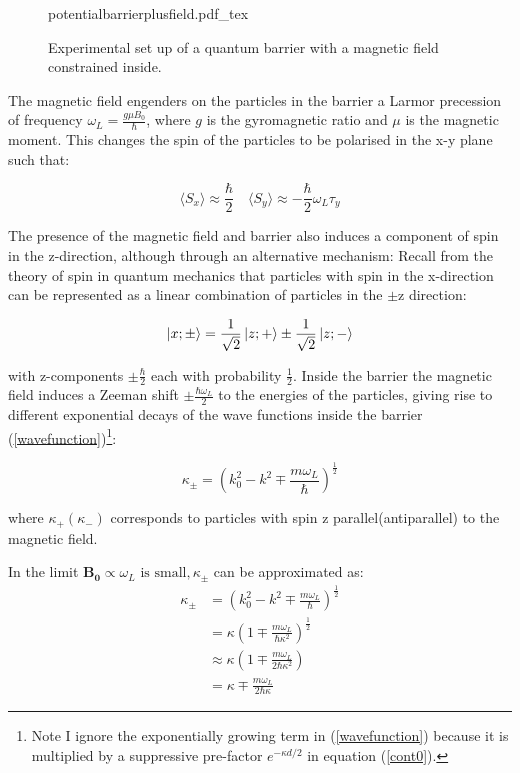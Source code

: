 \documentclass{article}
\newcommand{\incfig}[1]{%
    \def\svgwidth{10cm}
    {#1.pdf_tex}
}
\begin{document}
\begin{figure}[ht]
    \centering
    \incfig{potentialbarrierplusfield}
    \caption{Experimental set up of a quantum barrier with a magnetic field constrained inside.}
    \label{fig:potentialbarrierfield}
\end{figure}

\noindent The magnetic field engenders on the particles in the barrier a Larmor precession of frequency $\omega_L = \frac{g\mu B_0}{\hbar}$, where $g$ is the gyromagnetic ratio and $\mu$ is the magnetic moment. This changes the spin of the particles to be polarised in the x-y plane such that:

\begin{equation}
	\langle S_x \rangle \approx \frac{\hbar}{2} \quad \langle S_y \rangle \approx -\frac{\hbar}{2}\omega_L\tau_y
\end{equation}

\noindent The presence of the magnetic field and barrier also induces a component of spin in the z-direction, although through an alternative mechanism: Recall from the theory of spin in quantum mechanics that particles with spin in the x-direction can be represented as a linear combination of particles in the $\pm \text{z}$ direction:

\begin{equation}
	\ket{x; \pm} = \frac{1}{\sqrt{2}}\ket{z;+} \pm \frac{1}{\sqrt{2}}\ket{z;-}
\end{equation}

\noindent with z-components $\pm \frac{\hbar}{2}$ each with probability $\frac{1}{2}$. Inside the barrier the magnetic field induces a Zeeman shift $\pm \frac{\hbar\omega_L}{2}$ to the energies of the particles, giving rise to different exponential decays of the wave functions inside the barrier (\ref{wavefunction})\footnote{Note I ignore the exponentially growing term in (\ref{wavefunction}) because it is multiplied by a suppressive pre-factor $e^{-\kappa d/2}$ in equation (\ref{cont0}).}:

\begin{equation}
	\kappa_{\pm}=(k_0^2-k^2\mp \frac{m\omega_L}{\hbar})^{\frac{1}{2}}
\end{equation}

\noindent where $\kappa_{+}(\kappa_{-})$ corresponds to particles with spin z parallel(antiparallel) to the magnetic field.

\noindent In the limit $\boldsymbol{B_0} \propto \omega_L \text{ is small}, \kappa_{\pm}$ can be approximated as:
\begin{subequations}
\begin{align}
   \kappa_{\pm} &= \left(k^{2}_{0}-k^{2} \mp \frac{m \omega_{L}}{\hbar}\right)^{\frac{1}{2}}\\	
		&= \kappa \left(1 \mp \frac{m \omega_{L}}{\hbar \kappa^{2}}\right)^{\frac{1}{2}}\\
		&\approx \kappa \left(1 \mp \frac{m \omega_{L}}{2\hbar \kappa^{2}}\right)\\
		&= \kappa \mp \frac{m \omega_{L}}{2\hbar \kappa} \label{smallfieldkappa}
\end{align}
\end{subequations}
\end{document}
